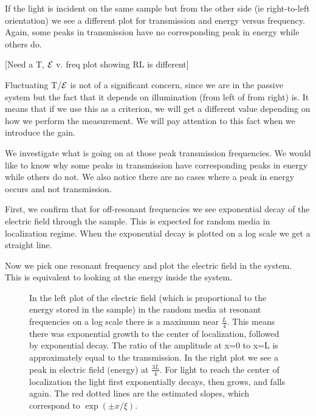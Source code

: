 If the light is incident on the same sample but from the other side (ie right-to-left orientation) we see a different plot for transmission and energy versus frequency. Again, some peaks in transmission have no corresponding peak in energy while others do.

[Need a T, ${\cal E}$ v. freq plot showing RL is different]

Fluctuating T/${\cal E}$ is not of a significant concern, since we are in the passive system but the fact that it depends on illumination (from left of from right) is. %
It means that if we use this as a criterion, we will get a different value depending on how we perform the measurement. We will pay attention to this fact when we introduce the gain.

We investigate what is going on at those peak transmission frequencies. We would like to know why some peaks in transmission have corresponding peaks in energy while others do not. We also notice there are no cases where a peak in energy occurs and not transmission.

First, we confirm that for off-resonant frequencies we see exponential decay of the electric field through the sample. This is expected for random media in localization regime. When the exponential decay is plotted on a log scale we get a straight line.

Now we pick one resonant frequency and plot the electric field in the system. This is equivalent to looking at the energy inside the system. 
\begin{figure}
\vskip -0.5cm
\centerline{
}
\vskip -0.5cm
\caption{
In the left plot of the electric field (which is 
proportional to the energy stored in the sample) in the
random media at resonant frequencies on a log 
scale there is a maximum near $ \frac{L}{4}$.
This means there was exponential growth to the 
center of localization, followed by exponential decay.
The ratio of the amplitude at x=0 to x=L is approximately equal to the transmission.
In the right plot we see a peak in electric field (energy) at $ \frac{3L}{4} $.
For light to reach the center of localization 
the light first exponentially decays, then grows, and falls again.
The red dotted lines are the estimated slopes, which correspond to $\exp(\pm x/\xi)$.}
\label{fig:onequarterthreequarterelecfield}
\end{figure}

